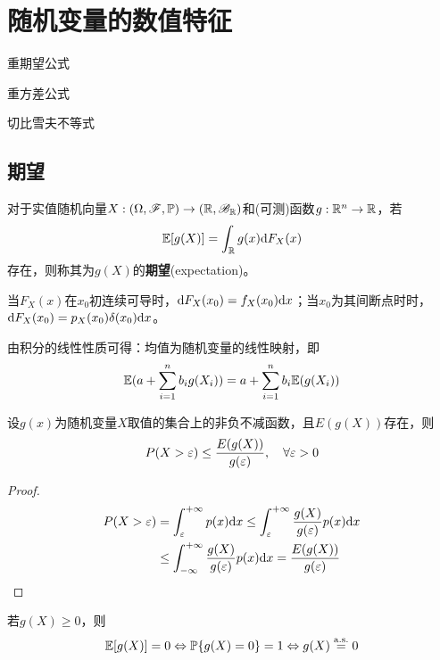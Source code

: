 \chapter{随机变量的数值特征}
\begin{introduction}[考试重点]
    \item 重期望公式
    \item 重方差公式
    \item 切比雪夫不等式
\end{introduction}
\section{期望}

\begin{definition}[期望]
    对于实值随机向量$X :(\Omega,\mathscr{F},\mathbb{P}) \to(\mathbb{R},\mathscr{B}_{\mathbb{R}})$和(可测)函数$g : \mathbb{R}^n \to \mathbb{R}$，若
    \[ \mathbb{E}[g(X)] = \int_{\mathbb{R}} g(x) \mathrm{d} F_X(x) \]
    存在，则称其为$g(X)$的\textbf{期望}(expectation)。
\end{definition}

\begin{remark}
    当$F_X(x)$在$x_0$初连续可导时，$\mathrm{d} F_X(x_0)=f_X(x_0)\mathrm{d} x$；当$x_0$为其间断点时时，$\mathrm{d} F_X(x_0)=p_X(x_0)\delta(x_0)\mathrm{d} x$。
\end{remark}


\begin{proposition}[期望的线性性质]
    由积分的线性性质可得：均值为随机变量的线性映射，即
    \[ \mathbb{E}(a+\sum_{i=1}^n b_i g(X_i))=a+\sum_{i=1}^n b_i \mathbb{E}(g(X_i)) \]
\end{proposition}

\begin{theorem}[Markov不等式]
    设$g(x)$为随机变量$X$取值的集合上的非负不减函数，且$E(g(X))$存在，则
    \[ P(X>\varepsilon) \leq \frac{E(g(X))}{g(\varepsilon)} ,\quad \forall \varepsilon > 0\]
\end{theorem}
\begin{proof}
    \begin{align*}
        P(X>\varepsilon) & =\int_{\varepsilon}^{+\infty}p(x) \mathrm{d} x \leq \int_{\varepsilon}^{+\infty}\frac{g(X)}{g(\varepsilon)}p(x) \mathrm{d} x \\
                & \leq \int_{-\infty}^{+\infty}\frac{g(X)}{g(\varepsilon)}p(x) \mathrm{d} x = \frac{E(g(X))}{g(\varepsilon)}
    \end{align*}
\end{proof}

\begin{corollary}
    若$g(X) \ge 0$，则
    \[ \mathbb{E}[g(X)] = 0 \Leftrightarrow  \mathbb{P}\{g(X)=0\} = 1 \Leftrightarrow g(X) \overset{\mathrm{a.s.}}{=} 0 \]
\end{corollary}

